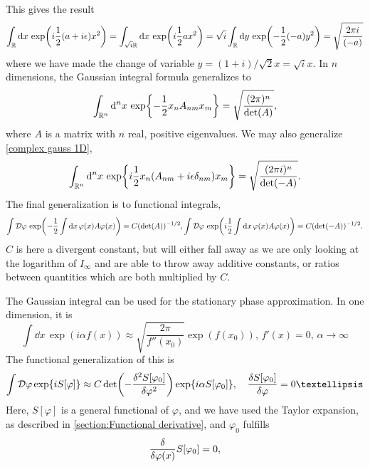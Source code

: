 This gives the result
\begin{equation}
    \label{complex gauss 1D}
    \int_{\mathbb{R}} \dd x \, \exp(i \frac{1}{2}(a + i\epsilon) x^2) 
    = \int_{\sqrt{i}\mathbb{R}} \dd x \, \exp(i\frac{1}{2} ax^2)
    = \sqrt{i} \int_{\mathbb{R}} \dd y\, \exp(-\frac{1}{2} (-a) y^2) = \sqrt{\frac{2 \pi i}{(-a)}}
\end{equation}
where we have made the change of variable $y = (1+i)/\sqrt{2} x = \sqrt{i} x$.
In $n$ dimensions, the Gaussian integral formula generalizes to
\begin{equation}
    \int_{\mathbb{R}^n} \dd^n x \, \exp{-\frac{1}{2} x_n A_{nm} x_m } =\sqrt{\frac{(2 \pi)^n}{\det(A)}},
\end{equation}
where $A$ is a matrix with $n$ real, positive eigenvalues.
We may also generalize \autoref{complex gauss 1D},
\begin{align}
    \int_{\mathbb{R}^n} \dd^n x \, \exp{i\frac{1}{2} x_n( A_{nm} + i \epsilon \delta_{nm}) x_m } =\sqrt{\frac{(2 \pi i )^n}{\det(-A)}}.
\end{align}
The final generalization is to functional integrals,
\begin{align}
    \int \mathcal{D} \varphi \, \exp(- \frac{1}{2} \int \dd x \, \varphi(x) A \varphi(x) )
    = C (\det(A))^{-1/2},
    \int \mathcal{D} \varphi \, \exp(i\frac{1}{2} \int \dd x \, \varphi(x) A \varphi(x) )
    = C (\det(-A))^{-1/2}.
\end{align}
$C$ is here a divergent constant, but will either fall away as we are only looking at the logarithm of $I_\infty$ and are able to throw away additive constants, or ratios between quantities which are both multiplied by $C$.

The Gaussian integral can be used for the stationary phase approximation.
In one dimension, it is
\begin{equation}
    \int \dd x \, \exp(i \alpha f(x)) 
    \approx \sqrt{\frac{2 \pi }{f''(x_0)}}\exp( f(x_0)), 
    \, f'(x) = 0, \, \alpha\rightarrow \infty
\end{equation}
The functional generalization of this is
\begin{equation}
    \int \D \varphi \exp{i S[\varphi]}
    \approx 
    C \det(- \frac{\delta^2 S[\varphi_0]}{\delta \varphi^2})
    \exp{i \alpha S[\varphi_0]  }, \quad
    \frac{\delta S[\varphi_0]}{\delta \varphi} = 0…
\end{equation}
Here, $S[\varphi]$ is a general functional of $\varphi$, and we have used the Taylor expansion, as described in \autoref{section:Functional derivative}, and $\varphi_0$ fulfills
\begin{equation}
    \frac{\delta }{\delta \varphi(x)}{S[\varphi_0]} = 0,
\end{equation}

